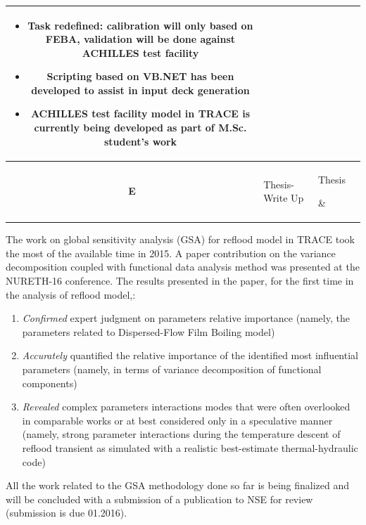 \documentclass[11pt,titlepage]{article}
\begin{document}
\begin{table}[h!]
\begin{center}
\begin{tabular}{c l l l}
{\begin{itemize}[leftmargin=1em,itemsep=1pt,parsep=0pt]
						\item \textbf{Task redefined}: calibration will only based on FEBA, validation will be done against ACHILLES test facility
						\item Scripting based on VB.NET has been developed to assist in input deck 		
							  generation
						\item ACHILLES test facility model in TRACE is currently being developed as part of M.Sc. student's work
					\end{itemize}}\\ \hline
				\textbf{E} 
				& \parbox[c]{0.2\textwidth}{
					Thesis-Write Up}
				& \parbox[c]{0.2\textwidth}{%
					Thesis} 
				& \\ 
			\bottomrule[1.5pt]
		\end{tabular}
	\end{center}
\end{table}
				
The work on global sensitivity analysis (GSA) for reflood model in TRACE took the most 
of the available time in 2015. 
A paper contribution on the variance decomposition coupled with functional data analysis method was
presented at the NURETH-16 conference.
The results presented in the paper, for the first time in the analysis of reflood model,:
\begin{enumerate}
	\item \emph{Confirmed} expert judgment on parameters relative 
	importance (namely, the parameters related to Dispersed-Flow Film Boiling model)
	\item \emph{Accurately} quantified the relative importance of the identified most influential parameters (namely, in terms of variance decomposition of functional components)
	\item \emph{Revealed} complex parameters interactions modes that were often overlooked in comparable works or at best considered only in a speculative manner (namely, strong parameter interactions during the temperature descent of reflood transient as simulated with a realistic best-estimate thermal-hydraulic code)
\end{enumerate}
All the work related to the GSA methodology done so far 
is being finalized and will be concluded with a submission of a publication to NSE 
for review (submission is due 01.2016).
\end{document}
